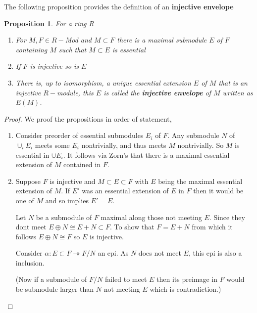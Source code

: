 \documentclass[12pt]{article}
\numberwithin{equation}{section}
\newtheorem{proposition}{Proposition}[section]
\begin{document}
	The following proposition provides the definition of an \textbf{injective envelope}
	\begin{proposition}
		For a ring $R$
		\begin{enumerate}
			\item For $M, F \in R-$Mod and $M \subset F$ there is a maximal submodule $E $ of $F$ containing $M$ such that $M \subset E$ is essential
			\item If $F$ is injective so is $E$
			\item There is, up to isomorphism, a unique essential extension $E$ of $M$ that is an injective $R-$module, this $E$ is called the \textbf{injective envelope} of $M$ written as $E(M)$.
		\end{enumerate}
	\end{proposition}
	\begin{proof}
		We proof the propositions in order of statement,
		\begin{enumerate}
			\item Consider preorder of essential submodules $E_i$ of $F$. 
			Any submodule $N$ of $\cup_i E_i$ meets some $E_i$ nontrivially, and thus meets $M$ nontrivially. So $M$ is essential in $\cup E_i$. It follows via Zorn's that there is a maximal essential extension of $M $ contained in $F$.
			\item Suppose $F$ is injective and $M \subset E \subset F$ with $E$ being the maximal essential extension of $M$. If $E'$ was an essential extension of $E$ in $F$ then it would be one of $M$ and so implies $E'=E$.
			
			 Let $N$ be a submodule of $F$ maximal along those not meeting $E$. Since they dont meet $E \oplus N\cong E+N \subset F$. To show that $F=E+N$ from which it follows $E \oplus N \cong F$ so $E$ is injective.
			
			Consider $\alpha: E \subset F \twoheadrightarrow F/N$ an epi. As $N$ does not meet $E$, this epi is also a inclusion.
			
			(Now if a submodule of $F/N$ failed to meet $E$ then its preimage in $F$ would be submodule larger than $N$ not meeting $E$ which is contradiction.)
			

\end{enumerate}
\end{proof}
\end{document}
